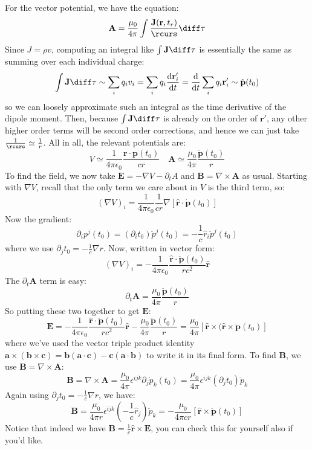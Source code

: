 For the vector potential, we have the equation:
\[
	\mathbf{A} = \frac{\mu_0}{4\pi} \int \frac{\mathbf{J}(\mathbf{r}, t_r)}{\rcurs} \diff \tau
\]
Since \( J = \rho v \), computing an integral like \( \int \mathbf{J} \diff \tau \) is essentially the same
as summing over each individual charge:
\[
	\int \mathbf{J} \diff \tau \sim \sum_i q_i v_i = \sum_i q_i \dv{\mathbf{r}'_i}{t} = \dv{t} \sum_i q_i
	\mathbf{r}'_i \sim \dot{\mathbf{p}}(t_0)
\]
so we can loosely approximate such an integral as the time derivative of the dipole moment. Then, because \(
\int \mathbf{J} \diff \tau \) is already on the order of \( \mathbf{r}' \), any other higher order terms will
be second order corrections, and hence we can just take \( \frac{1}{\rcurs} \simeq \frac{1}{r} \). All in
all, the relevant potentials are:
\[
	V \simeq \frac{1}{4\pi \epsilon_0} \frac{\mathbf{r} \cdot \mathbf{p}(t_0)}{cr} \quad \mathbf{A} \simeq
	\frac{\mu_0}{4\pi} \frac{\dot{\mathbf{p}}(t_0)}{r}
\]
To find the field, we now take \( \mathbf{E} = -\nabla V - \partial_t A \) and \( \mathbf{B} = \nabla
\times \mathbf{A} \) as usual. Starting with \( \nabla V \), recall that the only term we care about in \( V
\) is the third term, so:
\[
	(\nabla V)_i = \frac{1}{4\pi \epsilon_0} \frac{1}{cr} \nabla \left[ \mathbf{\hat{r}} \cdot
	\dot{\mathbf{p}}(t_0) \right]
\]
Now the gradient:
\[
	\partial_i p^{j}(t_0) = (\partial_i t_0) \ddot p^{j}(t_0) = -\frac{1}{c} \hat{r}_i \ddot p^{j}(t_0)
\]
where we use \( \partial_j t_0 = -\frac{1}{c} \nabla r \). Now, written in vector form:
\[
	(\nabla V)_i = -\frac{1}{4\pi \epsilon_0} \frac{\mathbf{\hat{r}} \cdot \ddot{\mathbf{p}}(t_0)}{rc^2}
	\mathbf{\hat{r}} 
\]
The \( \partial_t \mathbf{A} \) term is easy:
\[
	\partial_t \mathbf{A} = \frac{\mu_0}{4\pi} \frac{\ddot{\mathbf{p}}(t_0)}{r}
\]
So putting these two together to get \( \mathbf{E} \):
\[
	\mathbf{E} = -\frac{1}{4\pi \epsilon_0} \frac{\mathbf{\hat{r}} \cdot
	\ddot{\mathbf{p}}(t_0)}{rc^2}\mathbf{\hat{r}} - \frac{\mu_0}{4\pi} \frac{\ddot{\mathbf{p}}(t_0)}{r} =
	\frac{\mu_0}{4\pi} \left[ \mathbf{\hat{r}} \times (\mathbf{\hat{r}} \times \ddot{\mathbf{p}}(t_0) \right]
\]
where we've used the vector triple product identity \( \mathbf{a} \times (\mathbf{b} \times \mathbf{c}) =
\mathbf{b}(\mathbf{a} \cdot \mathbf{c}) - \mathbf{c}(\mathbf{a} \cdot \mathbf{b}) \) to write it in its final
form. To find \( \mathbf{B} \), we use \( \mathbf{B} = \nabla \times \mathbf{A} \):
\[
	\mathbf{B} = \nabla \times \mathbf{A} = \frac{\mu_0}{4\pi} \epsilon^{ijk}\partial_j \dot p_k(t_0) =
	\frac{\mu_0}{4\pi} \epsilon^{ijk} (\partial_j t_0) \ddot p_k
\]
Again using \( \partial_j t_0 = -\frac{1}{c} \nabla r \), we have:
\[
	\mathbf{B} = \frac{\mu_0}{4\pi r} \epsilon^{ijk} \left( -\frac{1}{c} \hat{r}_j \right) \ddot p_k =
	-\frac{\mu_0}{4\pi cr} \left[ \mathbf{\hat{r}} \times \ddot{\mathbf{p}}(t_0) \right]
\]
Notice that indeed we have \( \mathbf{B} = \frac{1}{c}\mathbf{\hat{r}} \times \mathbf{E} \), you can check
this for yourself also if you'd like. 

